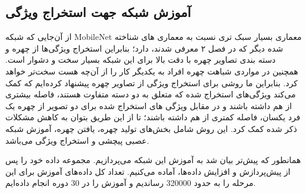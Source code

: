 \subsection{آموزش شبکه جهت استخراج ویژگی}
از آن‌جایی که ‌شبکه MobileNet معماری بسیار سبک تری نسبت به معماری های شناخته شده دیگر که در فصل ۲ معرفی شدند، دارد؛ بنابراین استخراج ویژگی‌ها از چهره و دسته بندی تصاویر چهره با دقت بالا برای این شبکه بسیار سخت و دشوار است. همچنین در مواردی شباهت چهره افراد به یکدیگر ‌کار را از آن‌چه هست سخت‌تر خواهد کرد. بنابراین ما روشی برای استخراج ویژگی از تصاویر چهره پیشنهاد کرده‌ایم که کمک می‌کند ویژگی‌های استخراج شده که متعلق به دو دسته متفاوت هستند، فاصله بیشتری از هم داشته باشند و در مقابل ویژگی های استخراج شده برای دو تصویر از چهره یک فرد یکسان، فاصله کمتری از هم داشته باشند؛ تا از این طریق بتوان به کاهش مشکلات ذکر شده کمک کرد. این روش شامل بخش‌های تولید چهره، یافتن چهره، آموزش شبکه عصبی پیچشی و ‌استخراج ویژگی می‌باشد.

همانطور که پیش‌تر بیان شد به آموزش این شبکه می‌پردازیم. مجموعه داده خود را پس از پیش‌پردازش و افزایش‌ داده‌ها، آماده می‌کنیم. تعداد کل داده‌های آموزش برای این مرحله را به حدود 320000 رساندیم و آموزش را در 30 دوره انجام داده‌ایم.
